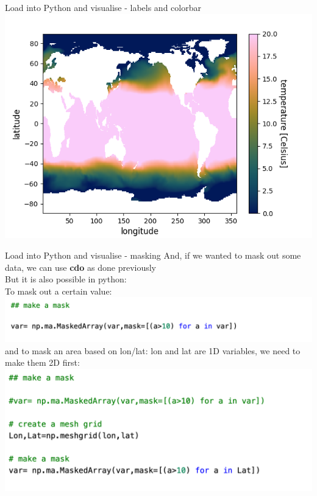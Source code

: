  
\begin{frame}{\insertsectionnumber{ |} Load into Python and visualise - labels and colorbar} 
        \vspace{0.5cm}
    \includegraphics[scale=0.45]{images/Script1_fig4.png}
\end{frame}
 
 
\begin{frame}{\insertsectionnumber{ |} Load into Python and visualise - masking} 
    And, if we wanted to mask out some data, we can use \textbf{cdo} as done previously\\
    But it is also possible in python:\\
        \vspace{0.2cm}
    To mask out a certain value:\\
    \includegraphics[scale=0.35]{images/Script1_step7.png}\\
        \vspace{0.5cm}
    and to mask an area based on lon/lat:
        \vspace{0.2cm}
    lon and lat are 1D variables, we need to make them 2D first:
    \includegraphics[scale=0.35]{images/Script1_step8.png}  
        \vspace{0.3cm}
\end{frame}
 
